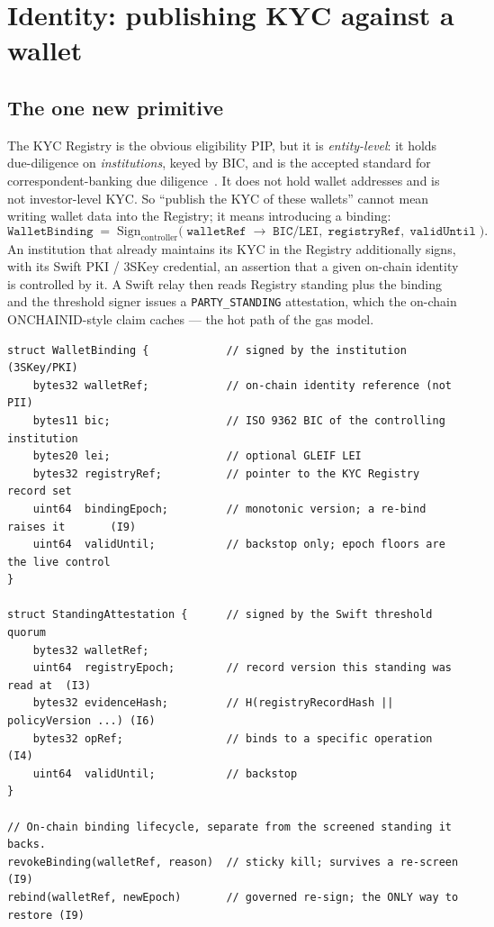 \documentclass[11pt,a4paper]{article}
\begin{document}
\section{Identity: publishing KYC against a wallet}
\label{sec:identity}

\subsection{The one new primitive}
The KYC Registry is the obvious eligibility PIP, but it is \emph{entity-level}:
it holds due-diligence on \emph{institutions}, keyed by BIC, and is the accepted
standard for correspondent-banking due diligence~\cite{swiftkyc}. It does not
hold wallet addresses and is not investor-level KYC. So ``publish the KYC of
these wallets'' cannot mean writing wallet data into the Registry; it means
introducing a binding:
\[
\texttt{WalletBinding} \;=\; \mathrm{Sign}_{\text{controller}}\big(\;\texttt{walletRef}
\;\rightarrow\; \texttt{BIC/LEI},\; \texttt{registryRef},\; \texttt{validUntil}\;\big).
\]
An institution that already maintains its KYC in the Registry additionally signs,
with its Swift PKI / 3SKey credential, an assertion that a given on-chain
identity is controlled by it. A Swift relay then reads Registry standing plus the
binding and the threshold signer issues a \texttt{PARTY\_STANDING} attestation,
which the on-chain ONCHAINID-style claim caches --- the hot path of the gas
model.

\begin{lstlisting}[caption={The wallet-to-BIC binding (EIP-712), and the
epoch-stamped, evidence-committing standing attestation derived from it. The
binding is signed by the controlling institution; the attestation is signed by
the Swift threshold quorum.},captionpos=b]
struct WalletBinding {            // signed by the institution (3SKey/PKI)
    bytes32 walletRef;            // on-chain identity reference (not PII)
    bytes11 bic;                  // ISO 9362 BIC of the controlling institution
    bytes20 lei;                  // optional GLEIF LEI
    bytes32 registryRef;          // pointer to the KYC Registry record set
    uint64  bindingEpoch;         // monotonic version; a re-bind raises it       (I9)
    uint64  validUntil;           // backstop only; epoch floors are the live control
}

struct StandingAttestation {      // signed by the Swift threshold quorum
    bytes32 walletRef;
    uint64  registryEpoch;        // record version this standing was read at  (I3)
    bytes32 evidenceHash;         // H(registryRecordHash || policyVersion ...) (I6)
    bytes32 opRef;                // binds to a specific operation              (I4)
    uint64  validUntil;           // backstop
}

// On-chain binding lifecycle, separate from the screened standing it backs.
revokeBinding(walletRef, reason)  // sticky kill; survives a re-screen        (I9)
rebind(walletRef, newEpoch)       // governed re-sign; the ONLY way to restore (I9)
\end{lstlisting}
\end{document}
